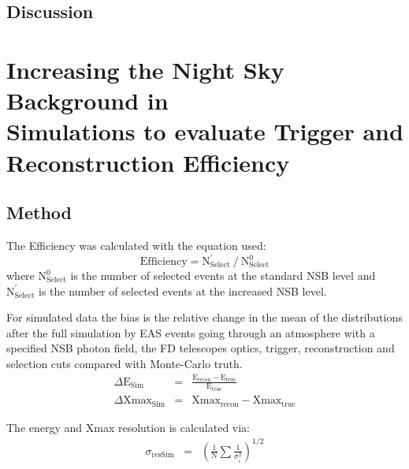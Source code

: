 \subsection{Discussion}

\section[Increasing NSB in Simulations to evaluate Trigger and Reconstruction Efficiency]{Increasing the Night Sky Background in \\ Simulations to evaluate Trigger and \\ Reconstruction Efficiency}

\subsection{Method}
 The Efficiency was calculated with the equation used:
\begin{equation}
\mathrm{Efficiency} = \mathrm{N}^{'}_{\mathrm{Select}} \ / \ \mathrm{N}^0_{\mathrm{Select}}
\end{equation}
where $\mathrm{N}^{0}_{\mathrm{Select}}$ is the number of selected events at the standard NSB level and $\mathrm{N}^{'}_{\mathrm{Select}}$ is the number of selected events at the increased NSB
level. 

For simulated data the bias is the relative change in the mean of the distributions after the full simulation by EAS events going through an atmosphere with a specified NSB photon field, the FD telescopes optics, trigger, reconstruction and selection cuts compared with Monte-Carlo truth.
\begin{eqnarray}
\Delta \mathrm{E}_{\mathrm{Sim}} &=& \frac{\mathrm{E}_{\mathrm{recon}} - \mathrm{E}_{\mathrm{true}}}{\mathrm{E}_{\mathrm{true}}}  \label{eq:energybias_sim} \\
\Delta \mathrm{Xmax}_{\mathrm{Sim}} &=& \mathrm{Xmax}_{\mathrm{recon}} - \mathrm{Xmax}_{\mathrm{true}} \label{eq:xmaxbias_sim}
\end{eqnarray}
 
 
The energy and Xmax resolution is calculated via:
\begin{eqnarray}
\sigma_{\mathrm{resSim}} &=& \left( \frac{1}{\mathrm{N}} \sum \frac{1}{\sigma^2_i} \right)^{1/2}
\end{eqnarray}

